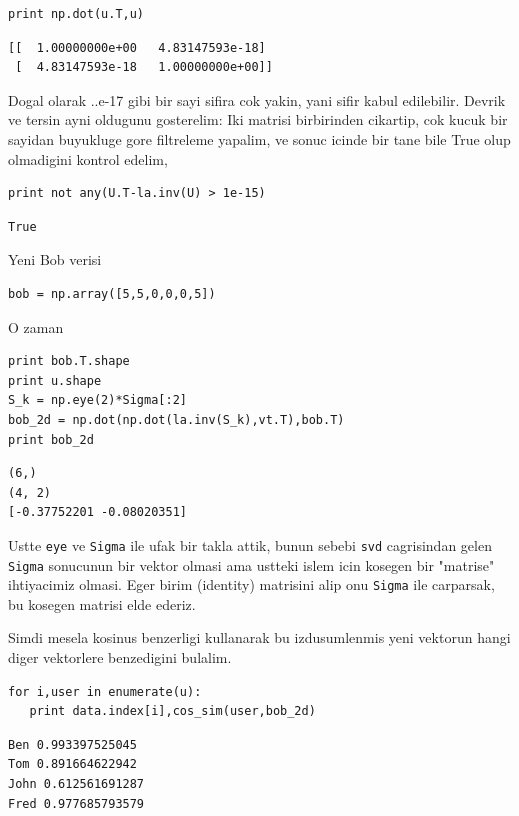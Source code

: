 \documentclass[12pt,fleqn]{article}\usepackage{../common}
\begin{document}
\begin{verbatim}
print np.dot(u.T,u)
\end{verbatim}

\begin{verbatim}
[[  1.00000000e+00   4.83147593e-18]
 [  4.83147593e-18   1.00000000e+00]]
\end{verbatim}

Dogal olarak ..e-17 gibi bir sayi sifira cok yakin, yani sifir kabul
edilebilir. Devrik ve tersin ayni oldugunu gosterelim: Iki matrisi
birbirinden cikartip, cok kucuk bir sayidan buyukluge gore filtreleme
yapalim, ve sonuc icinde bir tane bile True olup olmadigini kontrol
edelim,

\begin{verbatim}
print not any(U.T-la.inv(U) > 1e-15)
\end{verbatim}

\begin{verbatim}
True
\end{verbatim}

Yeni Bob verisi 

\begin{verbatim}
bob = np.array([5,5,0,0,0,5]) 
\end{verbatim}

O zaman 

\begin{verbatim}
print bob.T.shape
print u.shape
S_k = np.eye(2)*Sigma[:2]
bob_2d = np.dot(np.dot(la.inv(S_k),vt.T),bob.T)
print bob_2d
\end{verbatim}

\begin{verbatim}
(6,)
(4, 2)
[-0.37752201 -0.08020351]
\end{verbatim}

Ustte \verb!eye! ve \verb!Sigma! ile ufak bir takla attik, bunun sebebi
\verb!svd! cagrisindan gelen \verb!Sigma!  sonucunun bir vektor olmasi ama
ustteki islem icin kosegen bir "matrise" ihtiyacimiz olmasi. Eger birim
(identity) matrisini alip onu \verb!Sigma! ile carparsak, bu kosegen
matrisi elde ederiz.

Simdi mesela kosinus benzerligi kullanarak bu izdusumlenmis yeni
vektorun hangi diger vektorlere benzedigini bulalim.

\begin{verbatim}
for i,user in enumerate(u):
   print data.index[i],cos_sim(user,bob_2d)
\end{verbatim}

\begin{verbatim}
Ben 0.993397525045
Tom 0.891664622942
John 0.612561691287
Fred 0.977685793579
\end{verbatim}
\end{document}
